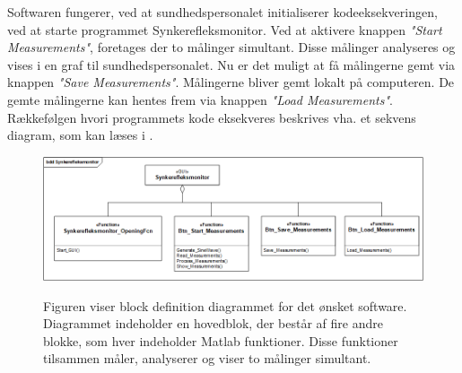 Softwaren fungerer, ved at sundhedspersonalet initialiserer kodeeksekveringen, ved at starte programmet Synkerefleksmonitor. Ved at aktivere knappen \textit{"Start Measurements"}, foretages der to målinger simultant. Disse målinger analyseres og vises i en graf til sundhedspersonalet. Nu er det muligt at få målingerne gemt via knappen \textit{"Save Measurements"}. Målingerne bliver gemt lokalt på computeren. De gemte målingerne kan hentes frem via knappen \textit{"Load Measurements"}. Rækkefølgen hvori programmets kode eksekveres beskrives vha. et sekvens diagram, som kan læses i .



\begin{figure}[H]
\centering
{\includegraphics[width=\linewidth]
{Figure/SWIBD}}
\caption{Figuren viser block definition diagrammet for det ønsket software. Diagrammet indeholder en hovedblok, der består af fire andre blokke, som hver indeholder Matlab funktioner. Disse funktioner tilsammen måler, analyserer og viser to målinger simultant.}
\label{fig:SWIBD}
\end{figure}

